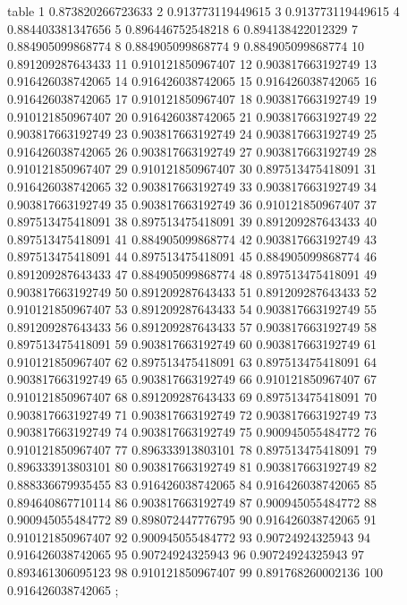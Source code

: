table {%
	1 0.873820266723633
	2 0.913773119449615
	3 0.913773119449615
	4 0.884403381347656
	5 0.896446752548218
	6 0.894138422012329
	7 0.884905099868774
	8 0.884905099868774
	9 0.884905099868774
	10 0.891209287643433
	11 0.910121850967407
	12 0.903817663192749
	13 0.916426038742065
	14 0.916426038742065
	15 0.916426038742065
	16 0.916426038742065
	17 0.910121850967407
	18 0.903817663192749
	19 0.910121850967407
	20 0.916426038742065
	21 0.903817663192749
	22 0.903817663192749
	23 0.903817663192749
	24 0.903817663192749
	25 0.916426038742065
	26 0.903817663192749
	27 0.903817663192749
	28 0.910121850967407
	29 0.910121850967407
	30 0.897513475418091
	31 0.916426038742065
	32 0.903817663192749
	33 0.903817663192749
	34 0.903817663192749
	35 0.903817663192749
	36 0.910121850967407
	37 0.897513475418091
	38 0.897513475418091
	39 0.891209287643433
	40 0.897513475418091
	41 0.884905099868774
	42 0.903817663192749
	43 0.897513475418091
	44 0.897513475418091
	45 0.884905099868774
	46 0.891209287643433
	47 0.884905099868774
	48 0.897513475418091
	49 0.903817663192749
	50 0.891209287643433
	51 0.891209287643433
	52 0.910121850967407
	53 0.891209287643433
	54 0.903817663192749
	55 0.891209287643433
	56 0.891209287643433
	57 0.903817663192749
	58 0.897513475418091
	59 0.903817663192749
	60 0.903817663192749
	61 0.910121850967407
	62 0.897513475418091
	63 0.897513475418091
	64 0.903817663192749
	65 0.903817663192749
	66 0.910121850967407
	67 0.910121850967407
	68 0.891209287643433
	69 0.897513475418091
	70 0.903817663192749
	71 0.903817663192749
	72 0.903817663192749
	73 0.903817663192749
	74 0.903817663192749
	75 0.900945055484772
	76 0.910121850967407
	77 0.896333913803101
	78 0.897513475418091
	79 0.896333913803101
	80 0.903817663192749
	81 0.903817663192749
	82 0.888336679935455
	83 0.916426038742065
	84 0.916426038742065
	85 0.894640867710114
	86 0.903817663192749
	87 0.900945055484772
	88 0.900945055484772
	89 0.898072447776795
	90 0.916426038742065
	91 0.910121850967407
	92 0.900945055484772
	93 0.90724924325943
	94 0.916426038742065
	95 0.90724924325943
	96 0.90724924325943
	97 0.893461306095123
	98 0.910121850967407
	99 0.891768260002136
	100 0.916426038742065
};
